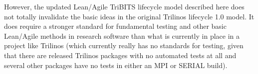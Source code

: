 \documentclass[11pt]{SANDreport}
\begin{document}
However, the updated Lean/Agile TriBITS lifecycle model described here
does not totally invalidate the basic ideas in the original Trilinos
lifecycle 1.0 model. It does require a stronger standard for
fundamental testing and other basic Lean/Agile methods in research
software than what is currently in place in a project like Trilinos
(which currently really has no standards for testing, given that there
are released Trilinos packages with no automated tests at all and
several other packages have no tests in either an MPI or SERIAL
build).


%
%



%
%


\end{document}
